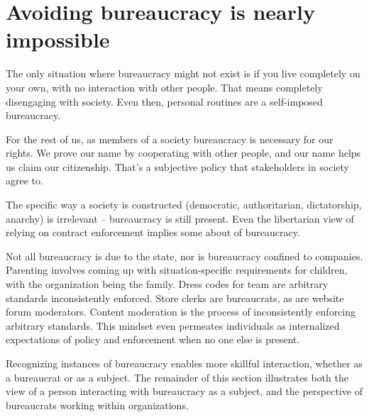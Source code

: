 \section{Avoiding bureaucracy is nearly impossible}

The only situation where bureaucracy might not exist is if you live completely on your own, with no interaction with other people. That means completely disengaging with society. Even then, personal routines are a self-imposed bureaucracy.


For the rest of us, as members of a society bureaucracy is necessary for our rights. We prove our name by cooperating with other people, and our name helps us claim our citizenship. That's a subjective policy that \glspl{stakeholder} in society agree to. 

The specific way a society is constructed (democratic, authoritarian, dictatorship, anarchy) is irrelevant -- bureaucracy is still present. Even the libertarian view of relying on contract enforcement implies some about of bureaucracy. 


Not all bureaucracy is due to the state, nor is bureaucracy confined to companies. Parenting involves coming up with situation-specific requirements for children, with the organization being the family. Dress codes for team are arbitrary standards inconsistently enforced. 
Store clerks are bureaucrats, as are website forum moderators.  Content moderation is the process of inconsistently enforcing arbitrary standards. This mindset even permeates individuals as internalized expectations of policy and enforcement when no one else is present. 

Recognizing instances of bureaucracy enables more skillful interaction, whether as a bureaucrat or as a subject. The remainder of this section  illustrates both the view of a person interacting with bureaucracy as a \gls{subject}, and the perspective of bureaucrats working within organizations. 




